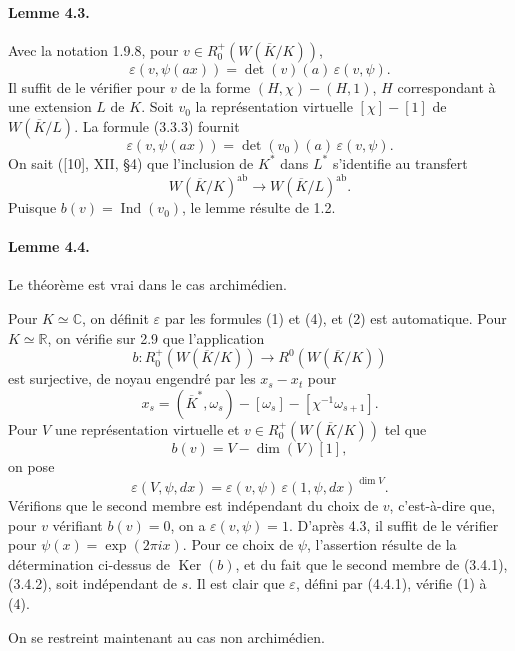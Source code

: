\documentclass[10pt,letterpaper]{article}
\newcommand{\C}{\mathbb C}
\newcommand{\Ind}{\operatorname{Ind}}
\providecommand{\Ker}{\operatorname{Ker}}
\providecommand{\ab}{\mathrm{ab}}
\providecommand{\R}{\mathbb R}
\providecommand{\ab}{\mathrm{ab}}
\providecommand{\ab}{\mathrm{ab}}
\providecommand{\Ind}{\operatorname{Ind}}
\providecommand{\Ker}{\operatorname{Ker}}
\begin{document}
\paragraph{Lemme 4.3.} Avec la notation 1.9.8, pour \(v\in R^+_0(W(\overline K/K))\),
\[
\varepsilon(v,\psi(ax))=\det(v)(a)\,\varepsilon(v,\psi).
\]
Il suffit de le vérifier pour \(v\) de la forme \((H,\chi)-(H,1)\), \(H\) correspondant à une extension \(L\) de \(K\). Soit \(v_0\) la représentation virtuelle \([\chi]-[1]\) de \(W(\overline K/L)\). La formule (3.3.3) fournit
\[
\varepsilon(v,\psi(ax))=\det(v_0)(a)\,\varepsilon(v,\psi).
\]
On sait ([10], XII, §4) que l'inclusion de \(K^*\) dans \(L^*\) s'identifie au transfert
\[
W(\overline K/K)^{\ab}\longrightarrow W(\overline K/L)^{\ab}.
\]
Puisque \(b(v)=\Ind(v_0)\), le lemme résulte de 1.2.

\paragraph{Lemme 4.4.} Le théorème est vrai dans le cas archimédien.

Pour \(K\simeq\C\), on définit \(\varepsilon\) par les formules (1) et (4), et (2) est automatique. Pour \(K\simeq\R\), on vérifie sur 2.9 que l'application
\[
b:R^+_0(W(\overline K/K))\longrightarrow R^0(W(\overline K/K))
\]
est surjective, de noyau engendré par les \(x_s-x_t\) pour
\[
x_s=(\overline K^*,\omega_s)-[\omega_s]-[\chi^{-1}\omega_{s+1}].
\]
Pour \(V\) une représentation virtuelle et \(v\in R^+_0(W(\overline K/K))\) tel que
\[
b(v)=V-\dim(V)[1],
\]
on pose
\[
\tag{4.4.1}
\varepsilon(V,\psi,dx)=\varepsilon(v,\psi)\,\varepsilon(1,\psi,dx)^{\dim V}.
\]
Vérifions que le second membre est indépendant du choix de \(v\), c'est-à-dire que, pour \(v\) vérifiant \(b(v)=0\), on a \(\varepsilon(v,\psi)=1\). D'après 4.3, il suffit de le vérifier pour \(\psi(x)=\exp(2\pi ix)\). Pour ce choix de \(\psi\), l'assertion résulte de la détermination ci-dessus de \(\Ker(b)\), et du fait que le second membre de (3.4.1), (3.4.2), soit indépendant de \(s\). Il est clair que \(\varepsilon\), défini par (4.4.1), vérifie (1) à (4).

On se restreint maintenant au cas non archimédien.
\end{document}
